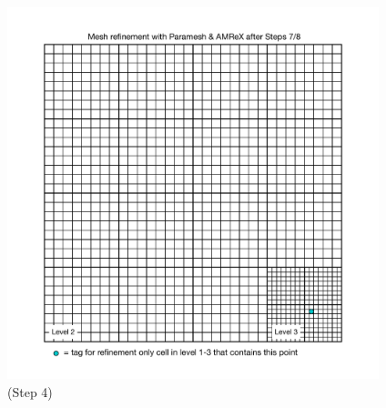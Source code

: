 \documentclass[12pt,letterpaper]{article}
\begin{document}
\begin{figure}[!hp]
\begin{center}
\includegraphics[width=4.25in]{TestRefine_Step8_Both.pdf}
\caption{(Step 4) }
\end{center}
\end{figure}

\newpage
\end{document}
